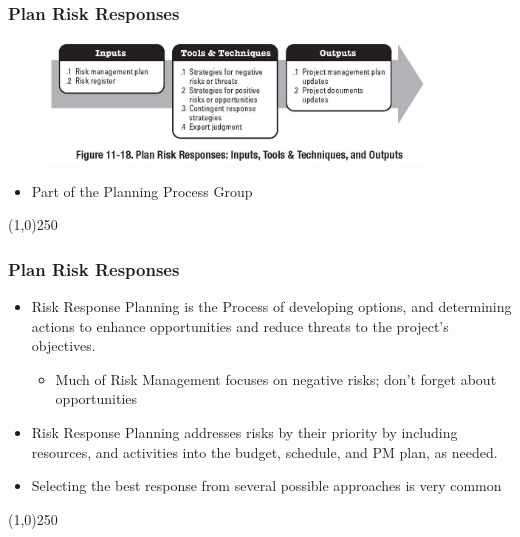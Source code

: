 \begin{frame}
\frametitle{Plan Risk Responses}
\begin{figure}
	\centering
		\includegraphics[width = 10cm]{images/Fig11-18.jpg}
	\label{fig:11-18}
\end{figure}
\begin{itemize}
\item Part of the Planning Process Group
\end{itemize}
\end{frame}\begin{center}\line(1,0){250}\end{center}






\begin{frame}
\frametitle{Plan Risk Responses}
\begin{itemize}
\item Risk Response Planning is the Process of developing options, and determining actions to enhance opportunities and reduce threats to the project's objectives.
\begin{itemize}
	\item Much of Risk Management focuses on negative risks; don't forget about opportunities
\end{itemize}
\item Risk Response Planning addresses risks by their priority by including resources, and activities into the budget, schedule, and PM plan, as needed.
\item Selecting the best response from several possible approaches is very common
\end{itemize}
\end{frame}\begin{center}\line(1,0){250}\end{center}





